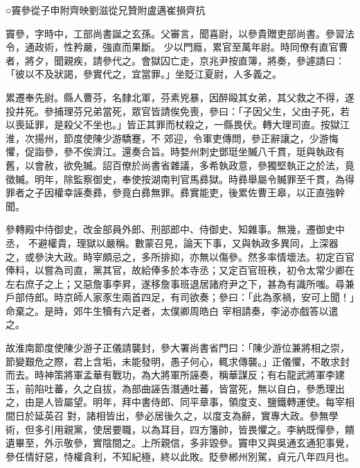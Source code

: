 
\begin{pinyinscope}

 ○竇參從子申附齊映劉滋從兄贊附盧邁崔損齊抗



 竇參，字時中，工部尚書誕之玄孫。父審言，聞喜尉，以參貴贈吏部尚書。參習法令，通政術，性矜嚴，強直而果斷。
 少以門廕，累官至萬年尉。時同僚有直官曹者，將夕，聞親疾，請參代之。會獄囚亡走，京兆尹按直簿，將奏，參遽請曰：「彼以不及狀謁，參實代之，宜當罪。」坐貶江夏尉，人多義之。



 累遷奉先尉。縣人曹芬，名隸北軍，芬素兇暴，因醉毆其女弟，其父救之不得，遂投井死。參捕理芬兄弟當死，眾官皆請俟免喪，參曰：「子因父生，父由子死，若以喪延罪，是殺父不坐也。」皆正其罪而杖殺之，一縣畏伏。轉大理司直。按獄江淮，次揚州，節度使陳少游驕蹇，不
 郊迎，令軍吏傳問，參正辭讓之，少游悔懼，促詣參，參不俟濟江。還奏合旨。時婺州刺史鄧珽坐贓八千貫，珽與執政有舊，以會赦，欲免贓。詔百僚於尚書省雜議，多希執政意，參獨堅執正之於法，竟徵贓。明年，除監察御史，奉使按湖南判官馬彞獄。時彞舉屬令贓罪至千貫，為得罪者之子因權幸誣奏彞，參竟白彞無罪。彞實能吏，後累佐曹王皋，以正直強幹聞。



 參轉殿中侍御史，改金部員外郎、刑部郎中、侍御史、知雜事。無幾，遷御史中丞，
 不避權貴，理獄以嚴稱。數蒙召見，論天下事，又與執政多異同，上深器之，或參決大政。時宰頗忌之，多所排抑，亦無以傷參。然多率情壞法。初定百官俸料，以嘗為司直，黨其官，故給俸多於本寺丞；又定百官班秩，初令太常少卿在左右庶子之上；又惡詹事李昇，遂移詹事班退居諸府尹之下，甚為有識所嗤。尋兼戶部侍郎。時京師人家豕生兩首四足，有司欲奏；參曰：「此為豕禍，安可上聞！」命棄之。是時，郊牛生犢有六足者，太僕卿周皓白
 宰相請奏，李泌亦戲答以遣之。



 故淮南節度使陳少游子正儀請襲封，參大署尚書省門曰：「陳少游位兼將相之崇，節變艱危之際，君上含垢，未能發明，愚子何心，輒求傳襲。」正儀懼，不敢求封而去。時神策將軍孟華有戰功，為大將軍所誣奏，稱華謀反；有右龍武將軍李建玉，前陷吐蕃，久之自拔，為部曲誣告潛通吐蕃，皆當死，無以自白，參悉理出之，由是人皆屬望。明年，拜中書侍郎、同平章事，領度支、鹽鐵轉運使。每宰相間日於延英召
 對，諸相皆出，參必居後久之，以度支為辭，實專大政。參無學術，但多引用親黨，使居要職，以為耳目，四方籓帥，皆畏懼之。李納既憚參，饋遺畢至，外示敬參，實陰間之。上所親信，多非毀參。竇申又與吳通玄通犯事覺，參任情好惡，恃權貪利，不知紀極，終以此敗。貶參郴州別駕，貞元八年四月也。




\end{pinyinscope}
